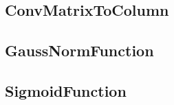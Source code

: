 \subsection{ConvMatrixToColumn}\label{ConvMatrixToColumn}

\newpage
\subsection{GaussNormFunction}\label{GaussNormFunction}

\newpage
\subsection{SigmoidFunction}\label{SigmoidFunction}
